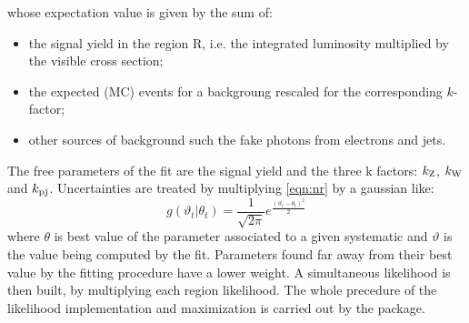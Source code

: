 whose expectation value is given by the sum of:
\begin{itemize}
\item the signal yield in the region R, i.e. the integrated luminosity multiplied by the visible cross section;
\item the expected (MC) events for a backgroung rescaled for the corresponding $k$-factor;
\item other sources of background such the fake photons from electrons and jets.
\end{itemize}

The free parameters of the fit are the signal yield and the three k factors: $k_{\textup{Z}}$, $k_{\textup{W}}$ and $k_{\textup{pj}}$. Uncertainties are treated by multiplying \ref{eqn:nr} by a gaussian like:
\begin{equation}
   g(\vartheta_{t} \vert \theta_{t}) = \frac{1}{\sqrt{2\pi}}e^{\frac{(\vartheta_{t}-\theta_{t})^2}{2} } 
\end{equation} 
where $\theta$ is best value of the parameter associated to a given systematic and $\vartheta$ is the value being computed by the fit. Parameters found far away from their best value by the fitting procedure have a lower weight. A simultaneous likelihood is then built, by multiplying each region likelihood. The whole precedure of the likelihood implementation and maximization is carried out by the \hf package.



